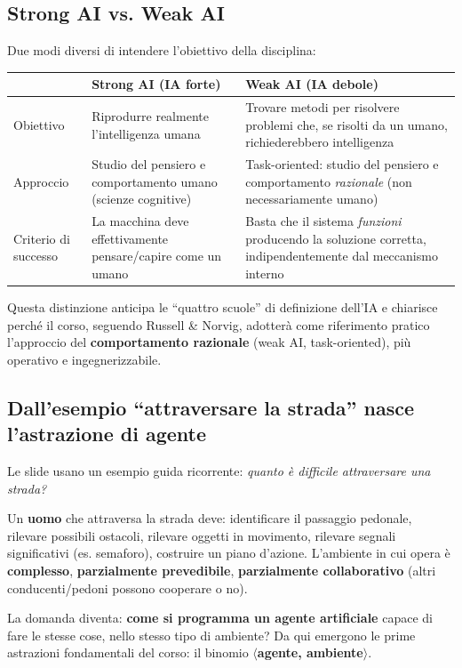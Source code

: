 \documentclass[11pt,a4paper]{report}
\begin{document}
\subsection{Strong AI vs. Weak AI}

Due modi diversi di intendere l'obiettivo della disciplina:

\begin{center}
\begin{tabular}{@{}p{2.4cm}p{5.5cm}p{5.5cm}@{}}
\toprule
 & \textbf{Strong AI (IA forte)} & \textbf{Weak AI (IA debole)} \\
\midrule
Obiettivo & Riprodurre realmente l'intelligenza umana & Trovare metodi per risolvere problemi che, se risolti da un umano, richiederebbero intelligenza \\
Approccio & Studio del pensiero e comportamento umano (scienze cognitive) & Task-oriented: studio del pensiero e comportamento \emph{razionale} (non necessariamente umano) \\
Criterio di successo & La macchina deve effettivamente pensare/capire come un umano & Basta che il sistema \emph{funzioni} producendo la soluzione corretta, indipendentemente dal meccanismo interno \\
\bottomrule
\end{tabular}
\end{center}

Questa distinzione anticipa le ``quattro scuole'' di definizione dell'IA e chiarisce perché il corso, seguendo Russell \& Norvig, adotterà come riferimento pratico l'approccio del \textbf{comportamento razionale} (weak AI, task-oriented), più operativo e ingegnerizzabile.

\subsection{Dall'esempio ``attraversare la strada'' nasce l'astrazione di agente}

Le slide usano un esempio guida ricorrente: \emph{quanto è difficile attraversare una strada?}

Un \textbf{uomo} che attraversa la strada deve: identificare il passaggio pedonale, rilevare possibili ostacoli, rilevare oggetti in movimento, rilevare segnali significativi (es. semaforo), costruire un piano d'azione. L'ambiente in cui opera è \textbf{complesso}, \textbf{parzialmente prevedibile}, \textbf{parzialmente collaborativo} (altri conducenti/pedoni possono cooperare o no).

La domanda diventa: \textbf{come si programma un agente artificiale} capace di fare le stesse cose, nello stesso tipo di ambiente? Da qui emergono le prime astrazioni fondamentali del corso: il binomio \textbf{$\langle$agente, ambiente$\rangle$}.
\end{document}

